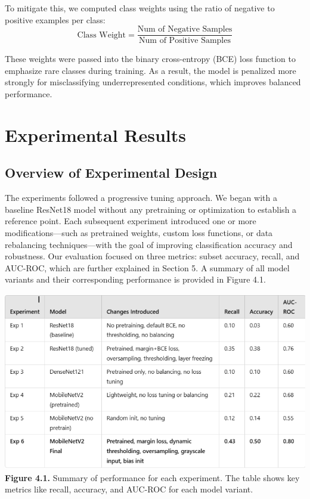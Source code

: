 \documentclass[12pt]{article}
\begin{document}
\begin{multicols}{2}
To mitigate this, we computed class weights using the ratio of negative to positive examples per class:
\[
\text{Class Weight} = \frac{\text{Num of Negative Samples}}{\text{Num of Positive Samples}}
\]

These weights were passed into the binary cross-entropy (BCE) loss function to emphasize rare classes during training. As a result, the model is penalized more strongly for misclassifying underrepresented conditions, which improves balanced performance.

\section{Experimental Results}

\subsection{Overview of Experimental Design}

The experiments followed a progressive tuning approach. We began with a baseline ResNet18 model without any pretraining or optimization to establish a reference point. Each subsequent experiment introduced one or more modifications—such as pretrained weights, custom loss functions, or data rebalancing techniques—with the goal of improving classification accuracy and robustness. Our evaluation focused on three metrics: subset accuracy, recall, and AUC-ROC, which are further explained in Section 5. A summary of all model variants and their corresponding performance is provided in Figure 4.1.

\begin{center}
    \includegraphics[width=\linewidth]{figure4.1.png}
    \textbf{Figure 4.1.} Summary of performance for each experiment. The table shows key metrics like recall, accuracy, and AUC-ROC for each model variant.
\end{center}


\end{multicols}
\end{document}
